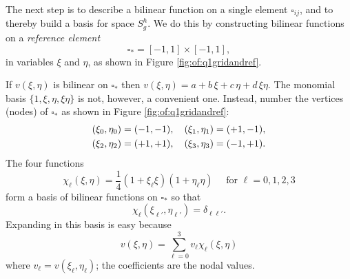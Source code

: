The next step is to describe a bilinear function on a single element $\square_{ij}$, and to thereby build a basis for space $S_g^h$.  We do this by constructing bilinear functions on a \emph{reference element}
    $$\square_\ast = [-1,1]\times[-1,1],$$
in variables $\xi$ and $\eta$, as shown in Figure \ref{fig:of:q1gridandref}.

If $v(\xi,\eta)$ is bilinear on $\square_\ast$ then $v(\xi,\eta) = a + b\, \xi + c\, \eta + d\, \xi \eta$.  The monomial basis $\{1,\xi,\eta,\xi\eta\}$ is not, however, a convenient one.  Instead, number the vertices (nodes) of $\square_\ast$ as shown in Figure \ref{fig:of:q1gridandref}:
\begin{align}
(\xi_0,\eta_0) &= (-1,-1), \quad (\xi_1,\eta_1) = (+1,-1),    \label{eq:of:refcorners} \\
(\xi_2,\eta_2) &= (+1,+1), \quad (\xi_3,\eta_3) = (-1,+1). \notag
\end{align}
The four functions
\begin{equation}
\chi_\ell(\xi,\eta) = \frac{1}{4} \left(1 + \xi_\ell \xi\right) \left(1 + \eta_\ell \eta\right)  \quad \text{ for } \ell=0,1,2,3 \label{eq:of:chidefn}
\end{equation}
form a basis of bilinear functions on $\square_\ast$ so that
    $$\chi_\ell(\xi_{\ell'},\eta_{\ell'}) = \delta_{\ell\ell'}.$$
Expanding in this basis is easy because
\begin{equation}
v(\xi,\eta) = \sum_{\ell=0}^3 v_\ell \chi_\ell(\xi,\eta) \label{eq:of:bilinearrepresentationref}
\end{equation}
where $v_\ell = v(\xi_\ell,\eta_\ell)$; the coefficients are the nodal values.

